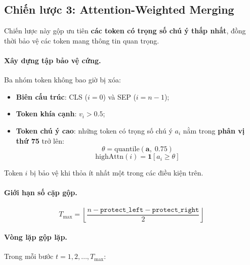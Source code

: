 \subsection{Chiến lược 3: Attention-Weighted Merging}
\label{subsec:attn_merge}

Chiến lược này gộp ưu tiên \textbf{các token có trọng số chú ý thấp
nhất}, đồng thời bảo vệ các token mang thông tin quan trọng.

\paragraph{Xây dựng tập bảo vệ cứng.}
Ba nhóm token không bao giờ bị xóa:

\begin{itemize}
  \item \textbf{Biên cấu trúc}: CLS ($i = 0$) và SEP ($i = n-1$);
  \item \textbf{Token khía cạnh}: $v_i > 0.5$;
  \item \textbf{Token chú ý cao}: những token có trọng số chú ý
    $a_i$ nằm trong \textbf{phân vị thứ 75} trở lên:
    \begin{equation}
      \theta = \mathrm{quantile}(\mathbf{a},\; 0.75)
      \label{eq:attn_threshold}
    \end{equation}
    \begin{equation}
      \mathrm{highAttn}(i) = \mathbf{1}[a_i \geq \theta]
      \label{eq:high_attn}
    \end{equation}
\end{itemize}

Token $i$ bị bảo vệ khi thỏa ít nhất một trong các điều kiện trên.

\paragraph{Giới hạn số cặp gộp.}
\begin{equation}
  T_{\max} = \left\lfloor
    \frac{n - \texttt{protect\_left} - \texttt{protect\_right}}{2}
  \right\rfloor
  \label{eq:max_merges}
\end{equation}

\paragraph{Vòng lặp gộp lặp.}
Trong mỗi bước $t = 1, 2, \dots, T_{\max}$:

